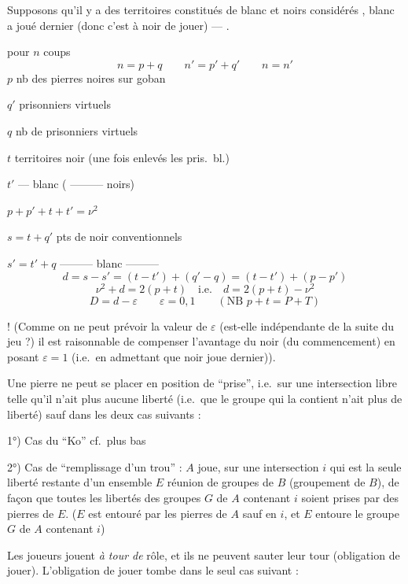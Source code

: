 \documentclass[11pt,a4paper]{article}
\begin{document}
Supposons qu'il y a des territoires constitués de blanc et noirs considérés
, blanc a joué dernier (donc c'est à noir de
jouer) — .

pour $n$ coups
\[
  n = p + q \qquad n' = p' + q' \qquad n = n'
\]
$p$ nb des pierres noires sur goban

$q'$  \ill{} prisonniers virtuels

$q$ nb de prisonniers virtuels

$t$ territoires noir (une fois enlevés les pris.\ bl.)

$t'$ \quad — \quad blanc ( ——— noirs)

$p + p' + t + t' = \nu^2$

$s = t + q'$ \quad pts de noir conventionnels

$s' = t' + q$ \quad ——— blanc ———
\[
  d = s - s' = (t - t') + (q' - q) = (t - t') + (p - p')
\]
\[
  \nu^2 + d = 2(p + t) \quad \text{i.e.} \quad
  \boxed{d = 2(p + t) - \nu^2}
\]
\[
  D = d - \varepsilon \qquad \varepsilon = 0, 1 \qquad
  (\text{NB } p + t = P + T)
\]

! (Comme on ne peut prévoir la valeur de $\varepsilon$ (est-elle indépendante
de la suite du jeu ?) il est raisonnable de compenser l'avantage du noir (du
commencement) en posant $\varepsilon = 1$ (i.e.\ en admettant que noir joue
dernier)).

Une pierre ne peut se placer en position de “prise”, i.e.\ sur une
intersection libre telle qu'il n'ait plus  aucune liberté
(i.e.\ que le groupe qui la contient n'ait plus de liberté) sauf dans les deux
cas suivants :

1°) Cas du “Ko” cf.\ plus bas

2°) Cas de “remplissage d'un trou” :  $A$ joue, sur une
 intersection $i$ qui est la seule liberté restante d'un
ensemble $E$ réunion de groupes de $B$ (groupement de $B$), de
façon que toutes les libertés des groupes $G$ de $A$ contenant $i$ soient
prises par des pierres de $E$. ($E$ est entouré par les pierres de $A$ sauf
en $i$, et $E$ entoure le groupe $G$ de $A$ contenant $i$)

  Les joueurs jouent
\emph{à tour de} rôle, et ils ne peuvent sauter leur tour (obligation de
jouer). L'obligation de jouer tombe dans le seul cas suivant :
\end{document}
